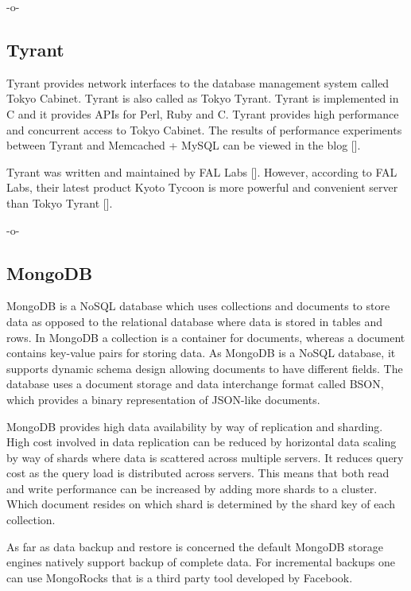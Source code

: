      -o-
     
\subsection{Tyrant}

Tyrant provides network interfaces to the database management system
called Tokyo Cabinet. Tyrant is also called as Tokyo Tyrant. Tyrant is
implemented in C and it provides APIs for Perl, Ruby and C. Tyrant
provides high performance and concurrent access to Tokyo Cabinet. The
results of performance experiments between Tyrant and Memcached +
MySQL can be viewed in the blog [\cite{www-tyrant-blog}].

Tyrant was written and maintained by FAL
Labs [\cite{www-tyrant-fal-labs}].  However, according to FAL Labs,
their latest product Kyoto Tycoon is more powerful and convenient
server than Tokyo Tyrant [\cite{www-kyoto-tycoon}].

     -o-


\subsection{MongoDB}

MongoDB is a NoSQL database which uses collections and documents to
store data as opposed to the relational database where data is stored
in tables and rows. In MongoDB a collection is a container for
documents, whereas a document contains key-value pairs for storing
data. As MongoDB is a NoSQL database, it supports dynamic schema
design allowing documents to have different fields. The database uses
a document storage and data interchange format called BSON, which
provides a binary representation of JSON-like documents.

MongoDB provides high data availability by way of replication and
sharding. High cost involved in data replication can be reduced by
horizontal data scaling by way of shards where data is scattered
across multiple servers. It reduces query cost as the query load is
distributed across servers. This means that both read and write
performance can be increased by adding more shards to a cluster. Which
document resides on which shard is determined by the shard key of each
collection.

As far as data backup and restore is concerned the default MongoDB
storage engines natively support backup of complete data. For
incremental backups one can use MongoRocks that is a third party tool
developed by Facebook.

